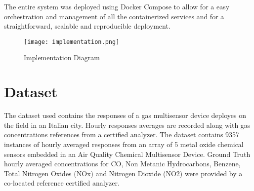 The entire system was deployed using Docker Compose to allow for a easy orchestration and management of all the containerized services and for a straightforward, scalable and reproducible deployment.

\begin{figure}[!h]
    \graphicspath{ {./diagrams/} }
    \texttt{[image: implementation.png]}
    \centering
    \caption{Implementation Diagram}
    \label{fig:imple_dia}
\end{figure}

\section{Dataset}
The dataset used contains the responses of a gas multisensor device deployes on the field in an Italian city. Hourly responses averages are recorded along with gas concentrations references from a certified analyzer. The dataset contains 9357 instances of hourly averaged responses from an array of 5 metal oxide chemical sensors embedded in an Air Quality Chemical Multisensor Device. Ground Truth hourly averaged concentrations for CO, Non Metanic Hydrocarbons, Benzene, Total Nitrogen Oxides (NOx) and Nitrogen Dioxide (NO2) were provided by a co-located reference certified analyzer.

